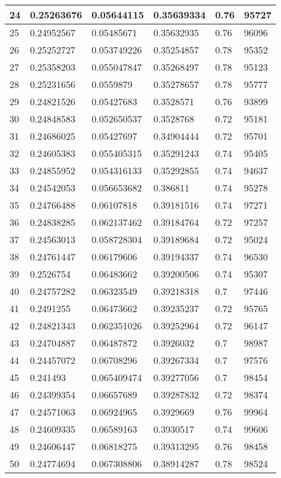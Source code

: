 \begin{longtable}{|l|l|l|l|l|l|}
24 & 0.25263676 & 0.05644115 & 0.35639334 & 0.76 & 95727 \\ \hline 
25 & 0.24952567 & 0.05485671 & 0.35632935 & 0.76 & 96096 \\ \hline 
26 & 0.25252727 & 0.053749226 & 0.35254857 & 0.78 & 95352 \\ \hline 
27 & 0.25358203 & 0.055047847 & 0.35268497 & 0.78 & 95123 \\ \hline 
28 & 0.25231656 & 0.0559879 & 0.35278657 & 0.78 & 95777 \\ \hline 
29 & 0.24821526 & 0.05427683 & 0.3528571 & 0.76 & 93899 \\ \hline 
30 & 0.24848583 & 0.052650537 & 0.3528768 & 0.72 & 95181 \\ \hline 
31 & 0.24686025 & 0.05427697 & 0.34904444 & 0.72 & 95701 \\ \hline 
32 & 0.24605383 & 0.055405315 & 0.35291243 & 0.74 & 95405 \\ \hline 
33 & 0.24855952 & 0.054316133 & 0.35292855 & 0.74 & 94637 \\ \hline 
34 & 0.24542053 & 0.056653682 & 0.386811 & 0.74 & 95278 \\ \hline 
35 & 0.24766488 & 0.06107818 & 0.39181516 & 0.74 & 97271 \\ \hline 
36 & 0.24838285 & 0.062137462 & 0.39184764 & 0.72 & 97257 \\ \hline 
37 & 0.24563013 & 0.058728304 & 0.39189684 & 0.72 & 95024 \\ \hline 
38 & 0.24761447 & 0.06179606 & 0.39194337 & 0.74 & 96530 \\ \hline 
39 & 0.2526754 & 0.06483662 & 0.39200506 & 0.74 & 95307 \\ \hline 
40 & 0.24757282 & 0.06323549 & 0.39218318 & 0.7 & 97446 \\ \hline 
41 & 0.2491255 & 0.06473662 & 0.39235237 & 0.72 & 95765 \\ \hline 
42 & 0.24821343 & 0.062351026 & 0.39252964 & 0.72 & 96147 \\ \hline 
43 & 0.24704887 & 0.06487872 & 0.3926032 & 0.7 & 98987 \\ \hline 
44 & 0.24457072 & 0.06708296 & 0.39267334 & 0.7 & 97576 \\ \hline 
45 & 0.241493 & 0.065409474 & 0.39277056 & 0.7 & 98454 \\ \hline 
46 & 0.24399354 & 0.06657689 & 0.39287832 & 0.72 & 98374 \\ \hline 
47 & 0.24571063 & 0.06924965 & 0.3929669 & 0.76 & 99964 \\ \hline 
48 & 0.24609335 & 0.06589163 & 0.3930517 & 0.74 & 99606 \\ \hline 
49 & 0.24606447 & 0.06818275 & 0.39313295 & 0.76 & 98458 \\ \hline 
50 & 0.24774694 & 0.067308806 & 0.38914287 & 0.78 & 98524 \\ \hline 
\end{longtable}
